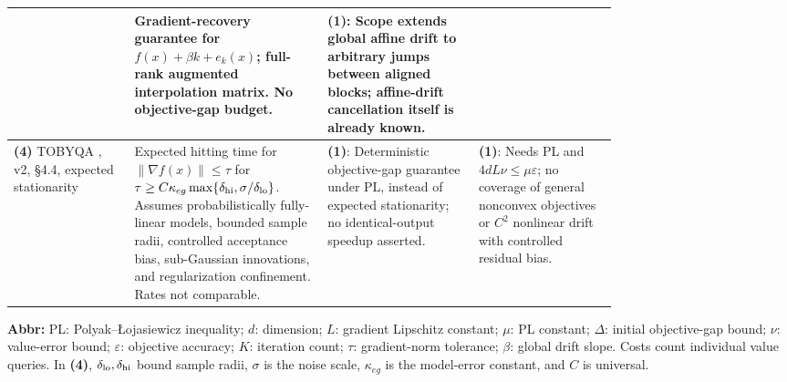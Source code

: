 \begin{table}[tp]
\begin{threeparttable}
\begin{tabularx}{\linewidth}{@{}>{\raggedright\arraybackslash}p{0.20\linewidth}>{\raggedright\arraybackslash}p{0.32\linewidth}>{\raggedright\arraybackslash}p{0.25\linewidth}>{\raggedright\arraybackslash}X@{}}
& Gradient-recovery guarantee for $f(x)+\beta k+e_k(x)$; full-rank augmented interpolation matrix. No objective-gap budget.
& \textbf{(1)}: Scope extends global affine drift to arbitrary jumps between aligned blocks; affine-drift cancellation itself is already known.
& \\
\midrule
\textbf{(4)} TOBYQA \citep{AffineDriftYao2026}, v2, \S4.4, expected stationarity
& Expected hitting time for $\|\nabla f(x)\|\le\tau$ for $\tau\ge C\kappa_{eg}\max\{\delta_{\rm hi},\sigma/\delta_{\rm lo}\}$. Assumes probabilistically fully-linear models, bounded sample radii, controlled acceptance bias, sub-Gaussian innovations, and regularization confinement. Rates not comparable.
& \textbf{(1)}: Deterministic objective-gap guarantee under PL, instead of expected stationarity; no identical-output speedup asserted.
& \textbf{(1)}: Needs PL and $4dL\nu\le\mu\varepsilon$; no coverage of general nonconvex objectives or $C^2$ nonlinear drift with controlled residual bias. \\
\bottomrule
\end{tabularx}
\begin{tablenotes}[flushleft]\footnotesize
\item[] \textbf{Abbr:} PL: Polyak--\L{}ojasiewicz inequality; $d$: dimension; $L$: gradient Lipschitz constant; $\mu$: PL constant; $\Delta$: initial objective-gap bound; $\nu$: value-error bound; $\varepsilon$: objective accuracy; $K$: iteration count; $\tau$: gradient-norm tolerance; $\beta$: global drift slope. Costs count individual value queries. In \textbf{(4)}, $\delta_{\rm lo},\delta_{\rm hi}$ bound sample radii, $\sigma$ is the noise scale, $\kappa_{eg}$ is the model-error constant, and $C$ is universal.
\end{tablenotes}
\end{threeparttable}
\end{table}
\clearpage
